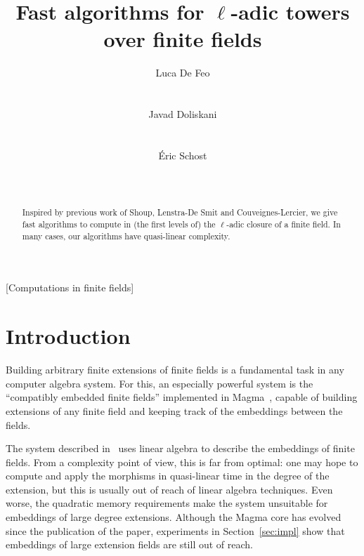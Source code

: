 \documentclass{sig-alternate}
\begin{document}
\title{Fast algorithms for {\huge$\ell$}-adic towers over finite fields}
\author{
  \alignauthor Luca De Feo\\
  \\
  \\
  \alignauthor Javad Doliskani\\
  \\
  \\
  \alignauthor \'Eric Schost\\
  \\
  \\
}

\maketitle
\begin{abstract}
  Inspired by previous work of Shoup, Lenstra-De Smit and
  Couveignes-Lercier, we give fast algorithms to compute in (the first
  levels of) the $\ell$-adic closure of a finite field. In many cases,
  our algorithms have quasi-linear complexity.
\end{abstract}
[Computations in finite fields]


\section{Introduction}
\label{sec:intro}

Building arbitrary finite extensions of finite fields is a fundamental
task in any computer algebra system. For this, an especially powerful
system is the ``compatibly embedded finite fields'' implemented in
Magma~\cite{MAGMA,bosma+cannon+steel97}, capable of building
extensions of any finite field and keeping track of the embeddings
between the fields.

The system described in~\cite{bosma+cannon+steel97} uses linear
algebra to describe the embeddings of finite fields. From a complexity
point of view, this is far from optimal: one may hope to compute and
apply the morphisms in quasi-linear time in the degree of the
extension, but this is usually out of reach of linear algebra
techniques. Even worse, the quadratic memory requirements make the
system unsuitable for embeddings of large degree extensions. Although
the Magma core has evolved since the publication of the paper,
experiments in Section~\ref{sec:impl} show that embeddings of large
extension fields are still out of reach.
\end{document}
